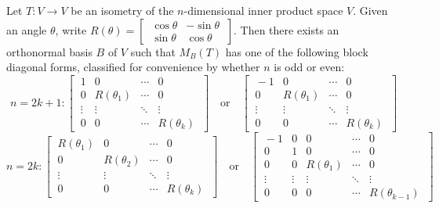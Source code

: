 \documentclass[12pt]{article}
\begin{document}
\begin{theorem}{}{}
    Let $ T : V \to V $ be an isometry of the $ n $-dimensional inner product space $ V $. Given an angle $ \theta $, write $ R \left( \theta \right) = \begin{bmatrix} \ \cos \theta & -\sin \theta \ \\ \ \sin \theta & \cos \theta \ \end{bmatrix} $. Then there exists an orthonormal basis $ B $ of $ V $ such that $ M_B \left( T \right) $ has one of the following block diagonal forms, classified for convenience by whether $ n $ is odd or even:
    \[ n = 2k + 1: \begin{bmatrix} \ 1 & 0 & \cdots & 0 \ \\ \ 0 & R \left( \theta_1 \right) & \cdots & 0 \ \\ \ \vdots & \vdots & \ddots & \vdots \ \\ \ 0 & 0 & \cdots & R \left( \theta_k \right) \ \end{bmatrix} \quad \text{or} \quad \begin{bmatrix} \ -1 & 0 & \cdots & 0 \ \\ \ 0 & R \left( \theta_1 \right) & \cdots & 0 \ \\ \ \vdots & \vdots & \ddots & \vdots \ \\ \ 0 & 0 & \cdots & R \left( \theta_k \right) \ \end{bmatrix} \]
    \[ n = 2k: \begin{bmatrix} \ R \left( \theta_1 \right) & 0 & \cdots & 0 \ \\ \ 0 & R \left( \theta_2 \right) & \cdots & 0 \ \\ \ \vdots & \vdots & \ddots & \vdots \ \\ \ 0 & 0 & \cdots & R \left( \theta_k \right) \ \end{bmatrix} \quad \text{or} \quad \begin{bmatrix} \ -1 & 0 & 0 & \cdots & 0 \ \\ \ 0 & 1 & 0 & \cdots & 0 \ \\ \ 0 & 0 & R \left( \theta_1 \right) & \cdots & 0 \ \\ \ \vdots & \vdots & \vdots & \ddots & \vdots \ \\ \ 0 & 0 & 0 & \cdots & R \left( \theta_{k - 1} \right) \ \end{bmatrix} \]
\end{theorem}
\end{document}
